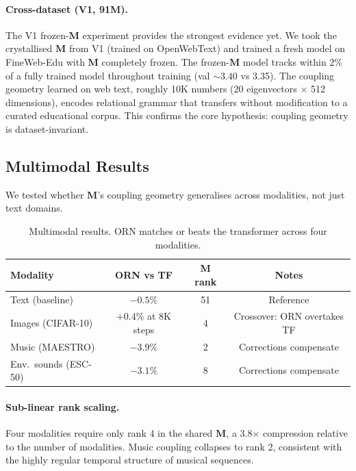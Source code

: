 \documentclass[11pt, a4paper]{article}
\newcommand{\M}{\mathbf{M}}
\theoremstyle{plain}
\theoremstyle{remark}
\begin{document}
\paragraph{Cross-dataset (V1, 91M).}
The V1 frozen-$\M$ experiment provides the strongest evidence yet.
We took the crystallised $\M$ from V1 (trained on OpenWebText) and trained a fresh model on FineWeb-Edu with $\M$ completely frozen.
The frozen-$\M$ model tracks within 2\% of a fully trained model throughout training (val ${\sim}3.40$ vs 3.35).
The coupling geometry learned on web text, roughly 10K numbers (20 eigenvectors $\times$ 512 dimensions), encodes relational grammar that transfers without modification to a curated educational corpus.
This confirms the core hypothesis: coupling geometry is dataset-invariant.

\subsection{Multimodal Results}

We tested whether $\M$'s coupling geometry generalises across modalities, not just text domains.

\begin{table}[h]
\centering\small
\begin{tabular}{@{}lccc@{}}
\toprule
\textbf{Modality} & \textbf{ORN vs TF} & \textbf{M rank} & \textbf{Notes} \\
\midrule
Text (baseline) & $-0.5\%$ & 51 & Reference \\
Images (CIFAR-10) & $+0.4\%$ at 8K steps & 4 & Crossover: ORN overtakes TF \\
Music (MAESTRO) & $-3.9\%$ & 2 & Corrections compensate \\
Env.\ sounds (ESC-50) & $-3.1\%$ & 8 & Corrections compensate \\
\bottomrule
\end{tabular}
\caption{Multimodal results. ORN matches or beats the transformer across four modalities.}
\label{tab:multimodal}
\end{table}

\paragraph{Sub-linear rank scaling.}
Four modalities require only rank 4 in the shared $\M$, a 3.8$\times$ compression relative to the number of modalities.
Music coupling collapses to rank 2, consistent with the highly regular temporal structure of musical sequences.
\end{document}

